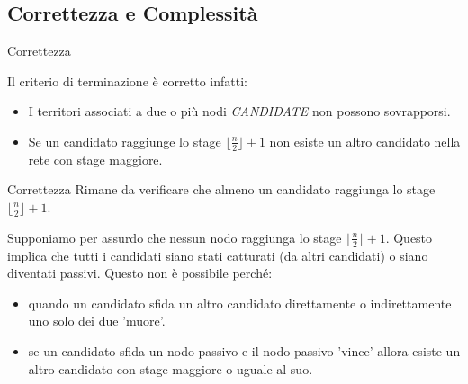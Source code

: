 \subsection{Correttezza e Complessità}

\begin{frame}{Correttezza}

Il criterio di terminazione è corretto infatti:

\begin{itemize}
\setlength\itemsep{2em}
 \item I territori associati a due o più nodi \textit{CANDIDATE} non possono sovrapporsi.
 \item Se un candidato raggiunge lo stage $\lfloor\frac{n}{2}\rfloor+1$ non esiste un altro candidato nella rete con stage maggiore.
\end{itemize}

\end{frame}

\begin{frame}{Correttezza}
 Rimane da verificare che almeno un candidato raggiunga lo stage $\lfloor\frac{n}{2}\rfloor+1$. 

 Supponiamo per assurdo che nessun nodo raggiunga lo stage $\lfloor\frac{n}{2}\rfloor+1$.  Questo implica che tutti i candidati siano stati catturati (da altri candidati) o siano diventati passivi.
 Questo non è possibile perché:
 \begin{itemize}
  \item quando un candidato sfida un altro candidato direttamente o indirettamente uno solo dei due 'muore'.
  \item se un candidato sfida un nodo passivo e il nodo passivo 'vince' allora esiste un altro candidato con stage maggiore o uguale al suo. 
 \end{itemize}

 
 
  
\end{frame}

